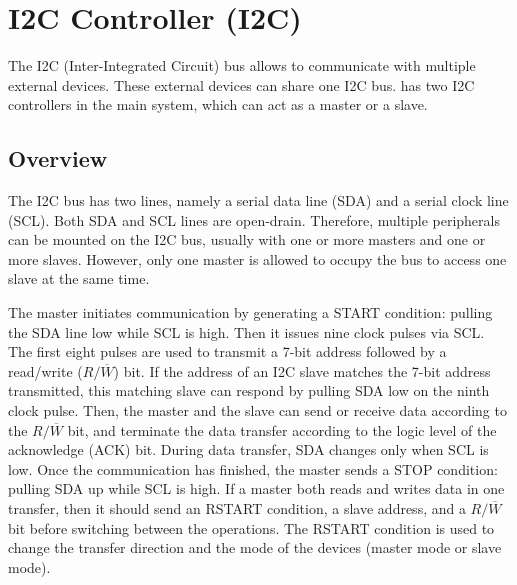 \documentclass[main\_\_EN.tex]{subfiles}
\begin{document}

\ifglobal
\else
    {\let\clearpage\relax \listoftodos}
    {\let\clearpage\relax \listofdonetodos}
    \tableofcontents
\fi






\hypertarget{i2c}{}
\chapter{I2C Controller (I2C)}
\label{mod:i2c}

The I2C (Inter-Integrated Circuit) bus allows \chipname{} to communicate with multiple external devices. These external devices can share one I2C bus.
\chipname{} has two I2C controllers in the main system, which can act as a master or a slave.


\section{Overview}
The I2C bus has two lines, namely a serial data line (SDA) and a serial clock line (SCL). Both SDA and SCL lines are open-drain. Therefore, multiple peripherals can be mounted on the I2C bus, usually with one or more masters and one or more slaves. However, only one master is allowed to occupy the bus to access one slave at the same time.

The master initiates communication by generating a START condition: pulling the SDA line low while SCL is high. Then it issues nine clock pulses via SCL. The first eight pulses are used to transmit a 7-bit address followed by a read/write ($R/\overline W$) bit. If the address of an I2C slave matches the 7-bit address transmitted, this matching slave can respond by pulling SDA low on the ninth clock pulse. Then, the master and the slave can send or receive data according to the $R/\overline W$ bit, and terminate the data transfer according to the logic level of the acknowledge (ACK) bit. During data transfer, SDA changes only when SCL is low. Once the communication has finished, the master sends a STOP condition: pulling SDA up while SCL is high. If a master both reads and writes data in one transfer, then it should send an RSTART condition, a slave address, and a $R/\overline W$ bit before switching between the operations. The RSTART condition is used to change the transfer direction and the mode of the devices (master mode or slave mode).
\end{document}
